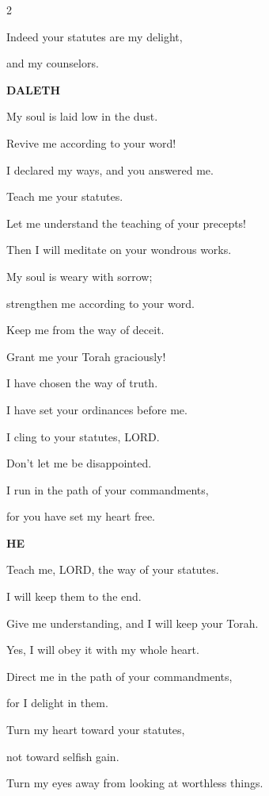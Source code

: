 \begin{multicols}{2}
	
	\myverse{}Indeed your statutes are my delight,
	
	and my counselors.
	
	\vspace{\baselineskip}
	
	\textbf{DALETH}
	
	
	\myverse{}My soul is laid low in the dust.
	
	Revive me according to your word!
	
	
	\myverse{}I declared my ways, and you answered me.
	
	Teach me your statutes.
	
	
	\myverse{}Let me understand the teaching of your precepts!
	
	Then I will meditate on your wondrous works.
	
	
	\myverse{}My soul is weary with sorrow;
	
	strengthen me according to your word.
	
	
	\myverse{}Keep me from the way of deceit.
	
	Grant me your Torah graciously!
	
	
	\myverse{}I have chosen the way of truth.
	
	I have set your ordinances before me.
	
	
	\myverse{}I cling to your statutes, LORD.
	
	Don’t let me be disappointed.
	
	
	\myverse{}I run in the path of your commandments,
	
	for you have set my heart free.
	
	\vspace{\baselineskip}
	
	\textbf{HE}
	
	
	\myverse{}Teach me, LORD, the way of your statutes.
	
	I will keep them to the end.
	
	
	\myverse{}Give me understanding, and I will keep your Torah.
	
	Yes, I will obey it with my whole heart.
	
	
	\myverse{}Direct me in the path of your commandments,
	
	for I delight in them.
	
	
	\myverse{}Turn my heart toward your statutes,
	
	not toward selfish gain.
	
	
	\myverse{}Turn my eyes away from looking at worthless things.
	

\end{multicols}
